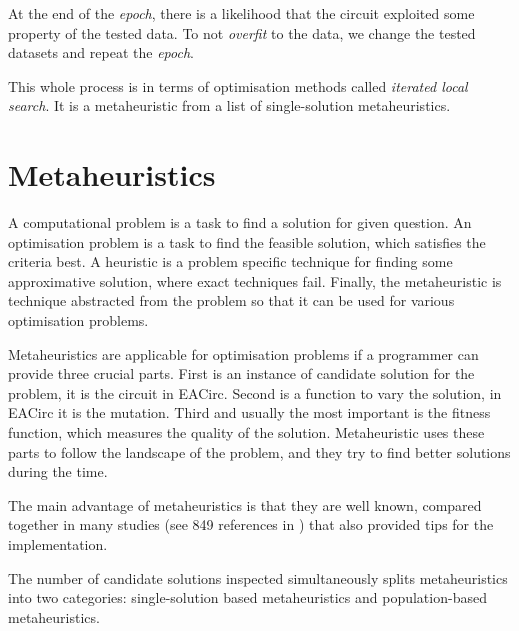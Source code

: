 \documentclass[
  print, %
  Table,   %
  nolof,     %
  nolot,     %
  11pt, %
  oneside  %
]{fithesis3}
\begin{document}
At the end of the \textit{epoch}, there is a likelihood that the circuit exploited some property of the tested data. To not \textit{overfit} to the data, we change the tested datasets and repeat the \textit{epoch}.

This whole process is in terms of optimisation methods called \textit{iterated local search}. It is a metaheuristic from a list of single-solution metaheuristics.


\chapter{Metaheuristics}
\label{chap:metaheuristics}

A computational problem is a task to find a solution for given question. An optimisation problem is a task to find the feasible solution, which satisfies the criteria best. A heuristic is a problem specific technique for finding some approximative solution, where exact techniques fail. Finally, the metaheuristic is technique abstracted from the problem so that it can be used for various optimisation problems.

Metaheuristics are applicable for optimisation problems if a programmer can provide three crucial parts. First is an instance of candidate solution for the problem, it is the circuit in EACirc. Second is a function to vary the solution, in EACirc it is the mutation. Third and usually the most important is the fitness function, which measures the quality of the solution. Metaheuristic uses these parts to follow the landscape of the problem, and they try to find better solutions during the time.

The main advantage of metaheuristics is that they are well known, compared together in many studies (see 849 references in \cite{talbi2009metaheuristics}) that also provided tips for the implementation.

The number of candidate solutions inspected simultaneously splits metaheuristics into two categories: single-solution based metaheuristics and population-based metaheuristics.

\end{document}
